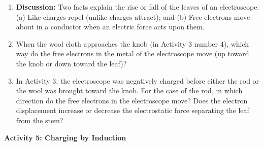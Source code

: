 \begin{enumerate}
\item \textbf{Discussion:} Two facts explain the rise or fall of the leaves
of an electroscope: (a) Like charges repel (unlike charges attract);
and (b) Free electrons move about in a conductor when an electric
force acts upon them.


\item When the wool cloth approaches the knob (in Activity 3 number 4), which way do the free electrons
in the metal of the electroscope move (up toward the knob or down
toward the leaf)?\vspace{15mm}


\item In Activity 3, the electroscope was negatively charged before either
the rod or the wool was brought toward the knob. For the case of the
rod, in which direction do the free electrons in the electroscope
move? Does the electron displacement increase or decrease the electrostatic
force separating the leaf from the stem?\vspace{15mm}

\end{enumerate}
\textbf{Activity 5: Charging by Induction}

